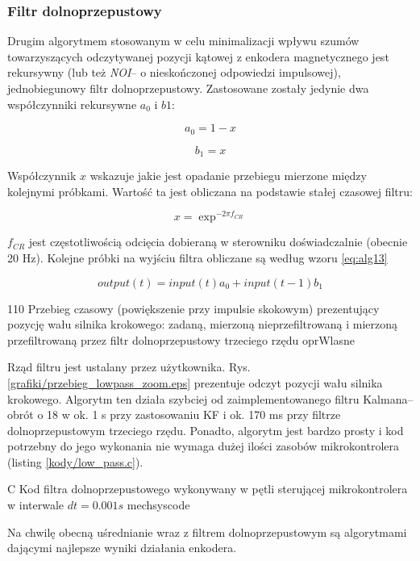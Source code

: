 \clearpage

\subsubsection{Filtr dolnoprzepustowy}

Drugim algorytmem stosowanym w celu minimalizacji wpływu szumów towarzyszących odczytywanej pozycji kątowej z enkodera magnetycznego jest rekursywny (lub też {\it NOI}-- o nieskończonej odpowiedzi impulsowej), jednobiegunowy filtr dolnoprzepustowy. Zastosowane zostały jedynie dwa współczynniki rekursywne $ a_0 $ i $ b1 $:

\begin{equation} \label{eq:alg10}
	a_0 = 1 - x
\end{equation}

\begin{equation} \label{eq:alg11}
	b_1 = x
\end{equation}

Współczynnik $ x $ wskazuje jakie jest opadanie przebiegu mierzone między kolejnymi próbkami. Wartość ta jest obliczana na podstawie stałej czasowej filtru:

\begin{equation} \label{eq:alg12}
	x = \exp^{-2 \pi f_{CR}}
\end{equation}

$ f_{CR} $ jest częstotliwością odcięcia dobieraną w sterowniku doświadczalnie (obecnie 20 Hz). Kolejne próbki na wyjściu filtra obliczane są według wzoru \ref{eq:alg13}

\begin{equation} \label{eq:alg13}
	output(t) = input(t) a_0 + input(t - 1) b_1 
\end{equation}

	{110}
	{Przebieg czasowy (powiększenie przy impulsie skokowym) prezentujący pozycję wału silnika krokowego: zadaną,   mierzoną nieprzefiltrowaną i mierzoną przefiltrowaną przez filtr dolnoprzepustowy trzeciego rzędu}
	{oprWlasne}
	
Rząd filtru jest ustalany przez użytkownika. Rys. \ref{grafiki/przebieg_lowpass_zoom.eps} prezentuje odczyt pozycji wału silnika krokowego. Algorytm ten działa szybciej od zaimplementowanego filtru Kalmana-- obrót o 18\degree{} w ok. 1 s przy zastosowaniu KF i ok. 170 ms przy filtrze dolnoprzepustowym trzeciego rzędu. Ponadto, algorytm jest bardzo prosty i kod potrzebny do jego wykonania nie wymaga dużej ilości zasobów mikrokontrolera (listing \ref{kody/low_pass.c}).

	{C}
	{Kod filtra dolnoprzepustowego wykonywany w pętli sterującej mikrokontrolera w interwale $ dt = 0.001 s $}
	{mechsyscode}
		   
Na chwilę obecną uśrednianie wraz z  filtrem dolnoprzepustowym są algorytmami dającymi najlepsze wyniki działania enkodera.















